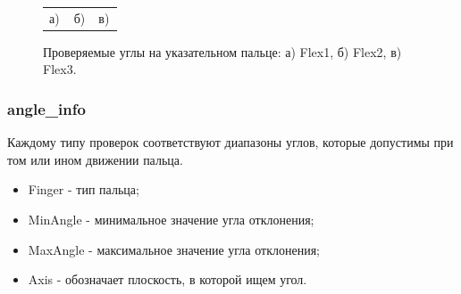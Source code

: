 \begin{figure}[H]
\begin{minipage}[h]{0.32\linewidth}
\end{minipage}
\hfill
\begin{minipage}[h]{0.32\linewidth}
\end{minipage}
\begin{minipage}[h]{1\linewidth}
\begin{tabular}{p{0.32\linewidth}p{0.32\linewidth}p{0.32\linewidth}}
\centering а) & \centering б) & \centering в) \\
\end{tabular}
\end{minipage}
\vspace*{-1cm}
\caption{Проверяемые углы на указательном пальце: а) Flex1, б) Flex2, в) Flex3.}
\label{fig:finger_motion_type_3}
\end{figure}

\subsubsection{angle\_info}
\hspace{0.6cm} Каждому типу проверок соответствуют диапазоны углов, которые допустимы при том или ином движении пальца.

\begin{itemize}
	\item Finger - тип пальца;
	\item MinAngle - минимальное значение угла отклонения;
	\item MaxAngle - максимальное значение угла отклонения;
	\item Axis - обозначает плоскость, в которой ищем угол.
\end{itemize}


